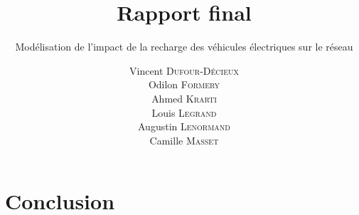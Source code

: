 \documentclass[12pt]{article}
\title{Rapport final}
\subtitle{Modélisation de l'impact de la recharge des véhicules électriques sur le réseau}
\author{ Vincent \textsc{Dufour-Décieux} \\ Odilon \textsc{Formery} \\ Ahmed \textsc{Krarti} \\ Louis \textsc{Legrand} \\ Augustin \textsc{Lenormand} \\ Camille \textsc{Masset} }
\begin{document}
\maketitle

\newpage
\renewcommand{\thepage}{}
\thispagestyle{empty}
\null
\newpage

\renewcommand{\thepage}{\arabic{page}}
\setcounter{page}{1}











\section*{Conclusion}



\end{document}
